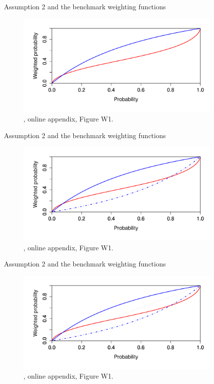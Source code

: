\documentclass[11pt, aspectratio=169]{beamer}
\begin{document}
\begin{frame}{Assumption 2 and the benchmark weighting functions}
    \begin{figure}
        \centering
        \includegraphics[width = 0.9\textwidth]{decomposition_distortions2}
        \caption{\citet{EbertStrack2015}, online appendix, Figure W1.}
    \end{figure}
\end{frame}

\begin{frame}{Assumption 2 and the benchmark weighting functions}
    \begin{figure}
        \centering
        \includegraphics[width = 0.9\textwidth]{decomposition_distortions3}
        \caption{\citet{EbertStrack2015}, online appendix, Figure W1.}
    \end{figure}
\end{frame}

\begin{frame}{Assumption 2 and the benchmark weighting functions}
    \begin{figure}
        \centering
        \includegraphics[width = 0.9\textwidth]{decomposition_distortions4}
        \caption{\citet{EbertStrack2015}, online appendix, Figure W1.}
    \end{figure}
\end{frame}
\end{document}
